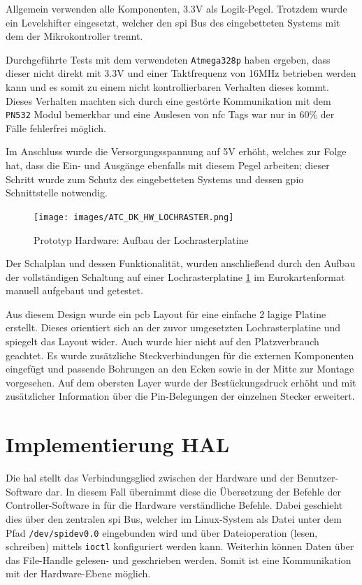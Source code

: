 Allgemein verwenden alle Komponenten, 3.3V als Logik-Pegel. Trotzdem
wurde ein Levelshifter eingesetzt, welcher den \gls{spi} Bus des
eingebetteten Systems mit dem der Mikrokontroller trennt.

Durchgeführte Tests mit dem verwendeten
\passthrough{\lstinline!Atmega328p!} haben ergeben, dass dieser nicht
direkt mit 3.3V und einer Taktfrequenz von 16MHz betrieben werden kann
und es somit zu einem nicht kontrollierbaren Verhalten dieses kommt.
Dieses Verhalten machten sich durch eine gestörte Kommunikation mit dem
\passthrough{\lstinline!PN532!} Modul bemerkbar und eine Auslesen von
\gls{nfc} Tags war nur in 60\% der Fälle fehlerfrei möglich.

Im Anschluss wurde die Versorgungsspannung auf 5V erhöht, welches zur
Folge hat, dass die Ein- und Ausgänge ebenfalls mit diesem Pegel
arbeiten; dieser Schritt wurde zum Schutz des eingebetteten Systems und
dessen \gls{gpio} Schnittstelle notwendig.

\begin{figure}
\centering
\texttt{[image: images/ATC\_DK\_HW\_LOCHRASTER.png]}
\caption{Prototyp Hardware: Aufbau der Lochrasterplatine
\label{ATC_DK_HW_LOCHRASTER}}
\end{figure}

Der Schalplan und dessen Funktionalität, wurden anschließend durch den
Aufbau der vollständigen Schaltung auf einer Lochrasterplatine
\ref{ATC_DK_HW_LOCHRASTER} im Eurokartenformat manuell aufgebaut und
getestet.

Aus diesem Design wurde ein \gls{pcb} Layout für eine einfache 2 lagige
Platine erstellt. Dieses orientiert sich an der zuvor umgesetzten
Lochrasterplatine und spiegelt das Layout wider. Auch wurde hier nicht
auf den Platzverbrauch geachtet. Es wurde zusätzliche Steckverbindungen
für die externen Komponenten eingefügt und passende Bohrungen an den
Ecken sowie in der Mitte zur Montage vorgesehen. Auf dem obersten Layer
wurde der Bestückungsdruck erhöht und mit zusätzlicher Information über
die Pin-Belegungen der einzelnen Stecker erweitert.

\hypertarget{implementierung-hal}{%
\section{Implementierung HAL}\label{implementierung-hal}}

Die \gls{hal} stellt das Verbindungsglied zwischen der Hardware und der
Benutzer-Software dar. In diesem Fall übernimmt diese die Übersetzung
der Befehle der Controller-Software in für die Hardware verständliche
Befehle. Dabei geschieht dies über den zentralen \gls{spi} Bus, welcher
im Linux-System als Datei unter dem Pfad
\passthrough{\lstinline!/dev/spidev0.0!} eingebunden wird und über
Dateioperation (lesen, schreiben) mittels
\passthrough{\lstinline!ioctl!} konfiguriert werden kann. Weiterhin
können Daten über das File-Handle gelesen- und geschrieben werden. Somit
ist eine Kommunikation mit der Hardware-Ebene möglich.

